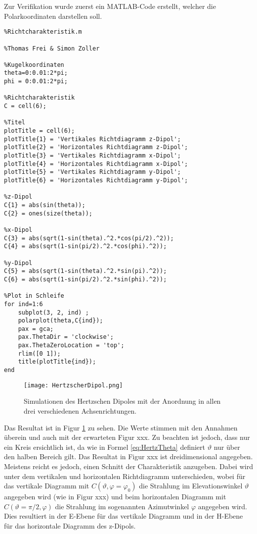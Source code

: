 Zur Verifikation wurde zuerst ein MATLAB-Code erstellt, welcher die Polarkoordinaten darstellen soll.

\begin{lstlisting}
%Richtcharakteristik.m

%Thomas Frei & Simon Zoller

%Kugelkoordinaten
theta=0:0.01:2*pi;
phi = 0:0.01:2*pi;

%Richtcharakteristik
C = cell(6);

%Titel
plotTitle = cell(6);
plotTitle{1} = 'Vertikales Richtdiagramm z-Dipol';
plotTitle{2} = 'Horizontales Richtdiagramm z-Dipol';
plotTitle{3} = 'Vertikales Richtdiagramm x-Dipol';
plotTitle{4} = 'Horizontales Richtdiagramm x-Dipol';
plotTitle{5} = 'Vertikales Richtdiagramm y-Dipol';
plotTitle{6} = 'Horizontales Richtdiagramm y-Dipol';

%z-Dipol
C{1} = abs(sin(theta));
C{2} = ones(size(theta));

%x-Dipol
C{3} = abs(sqrt(1-sin(theta).^2.*cos(pi/2).^2));
C{4} = abs(sqrt(1-sin(pi/2).^2.*cos(phi).^2));

%y-Dipol
C{5} = abs(sqrt(1-sin(theta).^2.*sin(pi).^2));
C{6} = abs(sqrt(1-sin(pi/2).^2.*sin(phi).^2));

%Plot in Schleife
for ind=1:6
    subplot(3, 2, ind) ;
    polarplot(theta,C{ind});
    pax = gca;
    pax.ThetaDir = 'clockwise';
    pax.ThetaZeroLocation = 'top';
    rlim([0 1]);
    title(plotTitle{ind});
end
\end{lstlisting}

\begin{figure}[!ht]
	\centering
    \texttt{[image: HertzscherDipol.png]}
    \caption{Simulationen des Hertzschen Dipoles mit der Anordnung in allen drei verschiedenen Achsenrichtungen.}
    \label{fig:HertzscherDipol}
\end{figure}

Das Resultat ist in Figur \ref{fig:HertzscherDipol} zu sehen. Die Werte stimmen mit den Annahmen überein und auch mit der erwarteten Figur xxx. Zu beachten ist jedoch, dass nur ein Kreis ersichtlich ist, da wie in Formel \ref{eq:HertzTheta} definiert $\vartheta$ nur über den halben Bereich gilt. Das Resultat in Figur xxx ist dreidimensional angegeben. Meistens reicht es jedoch, einen Schnitt der Charakteristik anzugeben. Dabei wird unter dem vertikalen und horizontalen Richtdiagramm unterschieden, wobei für das vertikale Diagramm mit $C(\vartheta, \varphi = \varphi_0)$ die Strahlung im Elevationswinkel $\vartheta$ angegeben wird (wie in Figur xxx) und beim horizontalen Diagramm mit $C(\vartheta=\pi/2, \varphi)$ die Strahlung im sogenannten Azimutwinkel $\varphi$ angegeben wird. Dies resultiert in der E-Ebene für das vertikale Diagramm und in der H-Ebene für das horizontale Diagramm des z-Dipols.\\

